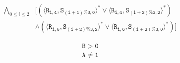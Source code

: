 \newsavebox{\boxMPZero}
\begin{lrbox}{\boxMPZero}
\begin{minipage}[t]{0.55\linewidth}
\large
\begin{align*}
\bigwedge_{0 \leq i \leq 2} & [(\langle\mathtt{R_{i,4}},\mathtt{S_{(i+1)\%3,0}}\rangle^* \vee\langle\mathtt{R_{i,4}},\mathtt{S_{(i+2) \% 3,2}}\rangle^*)\\
                                          & \wedge(\langle\mathtt{R_{i,6}},\mathtt{S_{(i+2)\%3,2}}\rangle^* \vee \langle\mathtt{R_{i,6}},\mathtt{S_{(i+2)\%3,0}}\rangle^*)]
\end{align*}
\end{minipage}
\end{lrbox}

\newsavebox{\boxProperty}
\begin{lrbox}{\boxProperty}
\begin{minipage}[t]{0.55\linewidth}
\large
\begin{align*}
\mathtt{B > 0}\\
\mathtt{A \neq 1}\\
\end{align*}
\end{minipage}
\end{lrbox}

\newcommand\exampleencoding{
\begin{figure*}[t]
\begin{center}
\setlength{\tabcolsep}{6pt}
\renewcommand{\arraystretch}{1.5}
\begin{tabular}[t]{p{1.5cm}ll}
Program Order & \scalebox{0.7}{\usebox{\boxPOInfinite}} & \scalebox{0.7}{\usebox{\boxPOZero}}\\
Match Pairs & \scalebox{0.7}{\usebox{\boxMPInfinite}} &  \scalebox{0.7}{\usebox{\boxMPZero}}\\
Program Properties   & \scalebox{0.7}{\usebox{\boxProperty}} & \scalebox{0.7}{\usebox{\boxProperty}}\\
&\multicolumn{1}{c}{(a)} &\multicolumn{1}{c}{(b)}\\
\end{tabular}
\end{center}
\caption{SMT encoding for an MPI concurrent trace program in \figref{fig:mpi}. (a) The infinite buffer encoding. (b) The zero buffer encoding.}
\label{fig:mpiencoding}
\end{figure*}
}


